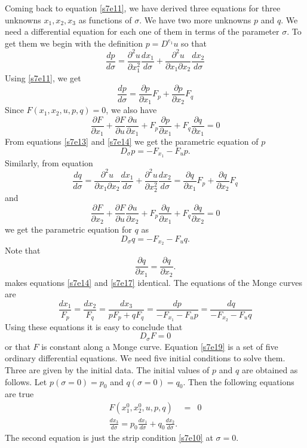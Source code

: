 \documentclass{article}
\newcommand{\td}[2]{\frac{d{#1}}{d{#2}}}
\newcommand{\pd}[2]{\frac{\partial{#1}}{\partial{#2}}}
\theoremstyle{plain}
\numberwithin{thm}{section}
\theoremstyle{plain}
\numberwithin{prop}{section}
\theoremstyle{definition}
\numberwithin{defn}{section}
\theoremstyle{remark}
\numberwithin{equation}{section}
\begin{document}
Coming back to equation \eqref{s7e11}, we have derived three equations for three unknowns $x_1, x_2,
x_3$ as functions of $\sigma$. We have two more unknowns $p$ and $q$. We need a differential equation
for each one of them in terms of the parameter $\sigma$. To get them we begin with the definition 
$p = D^{e_1}u$ so that
\begin{equation}\label{s7e12}
\td{p}{\sigma} = \frac{\partial^2 u}{\partial x_1^2}\td{x_1}{\sigma} + 
\frac{\partial^2 u}{\partial x_1\partial x_2}\td{x_2}{\sigma} 
\end{equation}
Using \eqref{s7e11}, we get
\begin{equation}\label{s7e13}
\td{p}{\sigma} = \pd{p}{x_1}F_{p} + \pd{p}{x_2}F_{q}
\end{equation}
Since $F(x_1, x_2, u, p, q) = 0$, we also have
\begin{equation}\label{s7e14}
\pd{F}{x_1} + \pd{F}{u}\pd{u}{x_1} + F_{p}\pd{p}{x_1} + F_{q}\pd{q}{x_1} = 0
\end{equation}
From equations \eqref{s7e13} and \eqref{s7e14} we get the parametric equation of $p$ 
\begin{equation}\label{s7e15}
D_\sigma p = -F_{x_1} - F_up.
\end{equation}
Similarly, from equation
\begin{equation}\label{s7e16}
\td{q}{\sigma} = \frac{\partial^2 u}{\partial x_1\partial x_2}\td{x_1}{\sigma} +
\frac{\partial^2 u}{\partial x_2^2}\td{x_2}{\sigma} = \pd{q}{x_1}F_{p} + \pd{q}{x_2}F_{q}
\end{equation}
and
\begin{equation}\label{s7e17}
\pd{F}{x_2} + \pd{F}{u}\pd{u}{x_2} + F_{p}\pd{q}{x_1} + F_{q}\pd{q}{x_2} = 0
\end{equation}
we get the parametric equation for $q$ as
\begin{equation}\label{s7e18}
D_\sigma q = -F_{x_2} - F_uq.
\end{equation}
Note that
\[
\pd{q}{x_1} = \pd{q}{x_2}.
\]
makes equations \eqref{s7e14} and \eqref{s7e17} identical. The equations of the Monge curves are 
\begin{equation}\label{s7e19}
\frac{dx_1}{F_{p}} = \frac{dx_2}{F_{q}} = \frac{dx_3}{pF_{p} + qF_{q}} = 
\frac{dp}{-F_{x_1} - F_{u}p} = \frac{dq}{-F_{x_2} - F_{u}q}
\end{equation}
Using these equations it is easy to conclude that
\begin{equation}\label{s7e20}
D_\sigma F = 0
\end{equation}
or that $F$ is constant along a Monge curve. Equation \eqref{s7e19} is a set of five ordinary 
differential equations. We need five initial conditions to solve them. Three are given by the initial
data. The initial values of $p$ and $q$ are obtained as follows. Let $p(\sigma = 0) = p_0$ and 
$q(\sigma = 0) = q_0$. Then the following equations are true
\begin{eqnarray}
F(x_1^0, x_2^0, u, p, q) &=& 0 \label{s7e21} \\
\td{x_3}{\sigma} = p_0\td{x_1}{\sigma} + q_0\td{x_2}{\sigma}. \label{s7e22} 
\end{eqnarray}
The second equation is just the strip condition \eqref{s7e10} at $\sigma = 0$.
\end{document}
